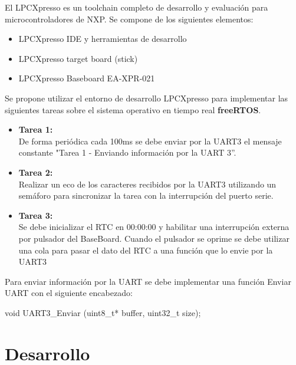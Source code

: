 \documentclass[a4paper,12pt]{article}
\begin{document}
El LPCXpresso es un toolchain completo de desarrollo y evaluación para microcontroladores de NXP.
Se compone de los siguientes elementos:
\begin{itemize}
\item LPCXpresso IDE y herramientas de desarrollo
\item LPCXpresso target board (stick)
\item LPCXpresso Baseboard EA-XPR-021
\end{itemize}

Se propone utilizar el entorno de desarrollo LPCXpresso para implementar las siguientes tareas sobre el sistema operativo en tiempo real \textbf{freeRTOS}.

\begin{itemize}
\item \textbf{Tarea 1:}\\
De forma periódica cada 100ms se debe enviar por la UART3 el mensaje constante "Tarea 1 - Enviando información por la UART 3”.
\item \textbf{Tarea 2:}\\
Realizar un eco de los caracteres recibidos por la UART3 utilizando un semáforo para sincronizar la tarea  con la interrupción del puerto serie.
\item \textbf{Tarea 3:}\\
Se debe inicializar el RTC en 00:00:00 y habilitar una interrupción externa por pulsador del BaseBoard. Cuando el pulsador se oprime se debe utilizar una cola para pasar el dato del RTC a una función que lo envie por la UART3
\end{itemize}

Para enviar información por la UART se debe implementar una función Enviar UART con el siguiente encabezado:

\begin{center}
void UART3\_Enviar (uint8\_t* buffer, uint32\_t size);
\end{center}

\newpage
\section{Desarrollo}
\end{document}
